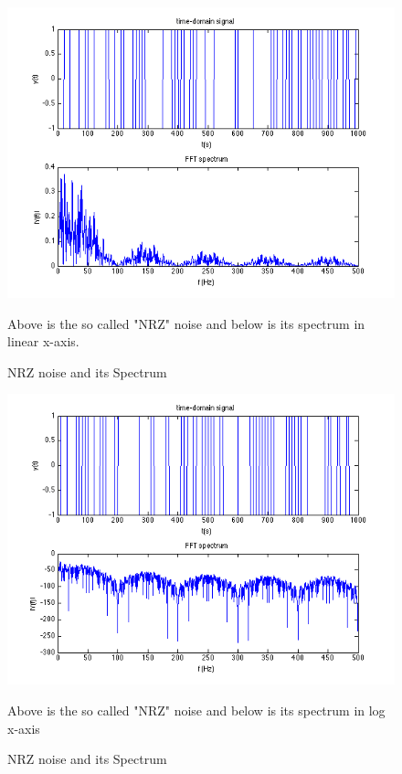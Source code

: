\documentclass[11pt]{article}
\begin{document}
\FloatBarrier
\begin{figure}[!h]
\includegraphics[scale=0.6]{elec_2_1.png}
\caption{ NRZ noise and its Spectrum}

\begin{minipage}{0.75\textwidth}
{\footnotesize Above is the so called "NRZ" noise and below is its spectrum in linear x-axis.}
\end{minipage}
\label{img:linear}
\end{figure}

\begin{figure}[!h]
\includegraphics[scale=0.6]{elec_2_2.png}
\caption{ NRZ noise and its Spectrum}

\begin{minipage}{0.75\textwidth}
{\footnotesize Above is the so called "NRZ" noise and below is its spectrum in log x-axis}
\end{minipage}
\label{img:log}
\end{figure}
\FloatBarrier
\end{document}
